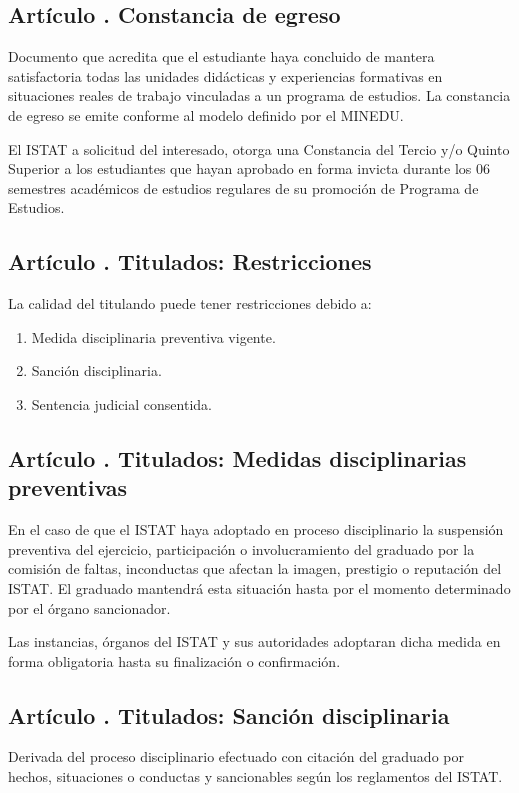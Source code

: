 \subsection{Artículo . Constancia de egreso}
\addtocounter{ns}{1}
Documento que acredita que el estudiante haya concluido de mantera satisfactoria todas las unidades didácticas y experiencias formativas en situaciones reales de trabajo vinculadas a un programa de estudios. La constancia de egreso se emite conforme al modelo definido por el MINEDU.

El ISTAT a solicitud del interesado, otorga una Constancia del Tercio y/o Quinto Superior a los estudiantes que hayan aprobado en forma invicta durante los 06 semestres académicos de estudios regulares de su promoción de Programa de Estudios.
\subsection{Artículo . Titulados: Restricciones}
\addtocounter{ns}{1}
La calidad del titulando puede tener restricciones debido a: 
\begin{enumerate}
\item Medida disciplinaria preventiva vigente. 
\item Sanción disciplinaria. 
\item Sentencia judicial consentida. 
\end{enumerate}
\subsection{Artículo . Titulados: Medidas disciplinarias preventivas}
\addtocounter{ns}{1}
En el caso de que el ISTAT haya adoptado en proceso disciplinario la suspensión preventiva del ejercicio, participación o involucramiento del graduado por la comisión de faltas, inconductas que afectan la imagen, prestigio o reputación del ISTAT. El graduado mantendrá esta situación hasta por el momento determinado por el órgano sancionador. 

Las instancias, órganos del ISTAT y sus autoridades adoptaran dicha medida en forma obligatoria hasta su finalización o confirmación. 
\subsection{Artículo . Titulados: Sanción disciplinaria}
\addtocounter{ns}{1}
Derivada del proceso disciplinario efectuado con citación del graduado por hechos, situaciones o conductas y sancionables según los reglamentos del ISTAT. 

